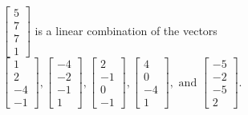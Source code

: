 \begin{exercise}
\begin{exerciseStatement}
  \end{exerciseStatement}
  \begin{exerciseAnswer}
   \(\left[\begin{array}{c}
5 \\
7 \\
7 \\
1
\end{array}\right]\) 
  	 is  
	a linear combination of the vectors \(\left[\begin{array}{c}
1 \\
2 \\
-4 \\
-1
\end{array}\right] , \left[\begin{array}{c}
-4 \\
-2 \\
-1 \\
1
\end{array}\right] , \left[\begin{array}{c}
2 \\
-1 \\
0 \\
-1
\end{array}\right] , \left[\begin{array}{c}
4 \\
0 \\
-4 \\
1
\end{array}\right] , \text{ and } \left[\begin{array}{c}
-5 \\
-2 \\
-5 \\
2
\end{array}\right]\).

	
  


  \end{exerciseAnswer}
\end{exercise}